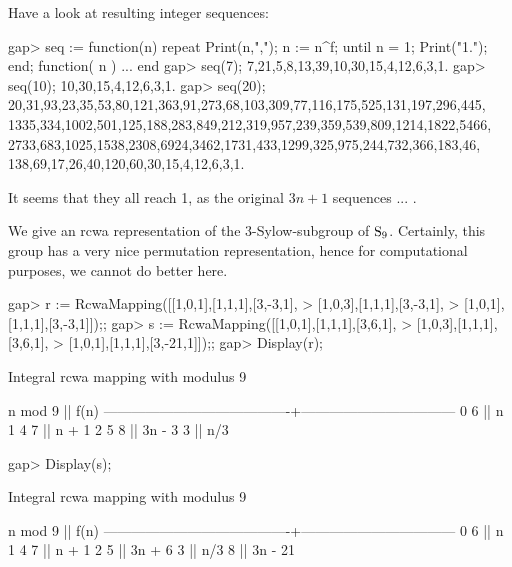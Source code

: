 \endexample

Have a look at resulting integer sequences:

\beginexample
gap> seq := function(n) repeat Print(n,","); n := n^f; until n = 1; Print("1.\n"); end;
function( n ) ... end
gap> seq(7);
7,21,5,8,13,39,10,30,15,4,12,6,3,1.
gap> seq(10);
10,30,15,4,12,6,3,1.
gap> seq(20);
20,31,93,23,35,53,80,121,363,91,273,68,103,309,77,116,175,525,131,197,296,445,
1335,334,1002,501,125,188,283,849,212,319,957,239,359,539,809,1214,1822,5466,
2733,683,1025,1538,2308,6924,3462,1731,433,1299,325,975,244,732,366,183,46,
138,69,17,26,40,120,60,30,15,4,12,6,3,1.
\endexample

It seems that they all reach 1, as the original $3n+1$ sequences ... .


We give an rcwa representation of the 3-Sylow-subgroup of ${\rm S}_9$.
Certainly, this group has a very nice permutation representation, hence
for computational purposes, we cannot do better here.

\beginexample
gap> r := RcwaMapping([[1,0,1],[1,1,1],[3,-3,1],
>                      [1,0,3],[1,1,1],[3,-3,1],
>                      [1,0,1],[1,1,1],[3,-3,1]]);;
gap> s := RcwaMapping([[1,0,1],[1,1,1],[3,6,1],
>                      [1,0,3],[1,1,1],[3,6,1],
>                      [1,0,1],[1,1,1],[3,-21,1]]);;
gap> Display(r);

Integral rcwa mapping with modulus 9

               n mod 9                  ||              f(n)              
----------------------------------------+---------------------------------
  0 6                                   || n
  1 4 7                                 || n + 1
  2 5 8                                 || 3n - 3
  3                                     || n/3

gap> Display(s);

Integral rcwa mapping with modulus 9

               n mod 9                  ||              f(n)              
----------------------------------------+---------------------------------
  0 6                                   || n
  1 4 7                                 || n + 1
  2 5                                   || 3n + 6
  3                                     || n/3
  8                                     || 3n - 21

